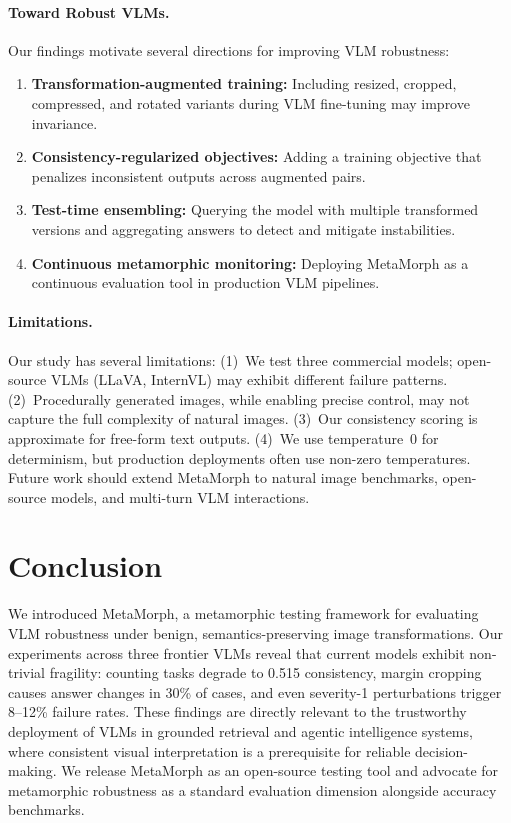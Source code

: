 \documentclass[10pt,twocolumn,letterpaper]{article}
\begin{document}
\paragraph{Toward Robust VLMs.}
Our findings motivate several directions for improving VLM robustness:
\begin{enumerate}
    \item \textbf{Transformation-augmented training:} Including resized, cropped, compressed, and rotated variants during VLM fine-tuning may improve invariance.
    \item \textbf{Consistency-regularized objectives:} Adding a training objective that penalizes inconsistent outputs across augmented pairs.
    \item \textbf{Test-time ensembling:} Querying the model with multiple transformed versions and aggregating answers to detect and mitigate instabilities.
    \item \textbf{Continuous metamorphic monitoring:} Deploying MetaMorph as a continuous evaluation tool in production VLM pipelines.
\end{enumerate}

\paragraph{Limitations.}
Our study has several limitations: (1)~We test three commercial models; open-source VLMs (LLaVA, InternVL) may exhibit different failure patterns. (2)~Procedurally generated images, while enabling precise control, may not capture the full complexity of natural images. (3)~Our consistency scoring is approximate for free-form text outputs. (4)~We use temperature~0 for determinism, but production deployments often use non-zero temperatures. Future work should extend MetaMorph to natural image benchmarks, open-source models, and multi-turn VLM interactions.

\section{Conclusion}
\label{sec:conclusion}

We introduced MetaMorph, a metamorphic testing framework for evaluating VLM robustness under benign, semantics-preserving image transformations. Our experiments across three frontier VLMs reveal that current models exhibit non-trivial fragility: counting tasks degrade to 0.515 consistency, margin cropping causes answer changes in 30\% of cases, and even severity-1 perturbations trigger 8--12\% failure rates. These findings are directly relevant to the trustworthy deployment of VLMs in grounded retrieval and agentic intelligence systems, where consistent visual interpretation is a prerequisite for reliable decision-making. We release MetaMorph as an open-source testing tool and advocate for metamorphic robustness as a standard evaluation dimension alongside accuracy benchmarks.
\end{document}

